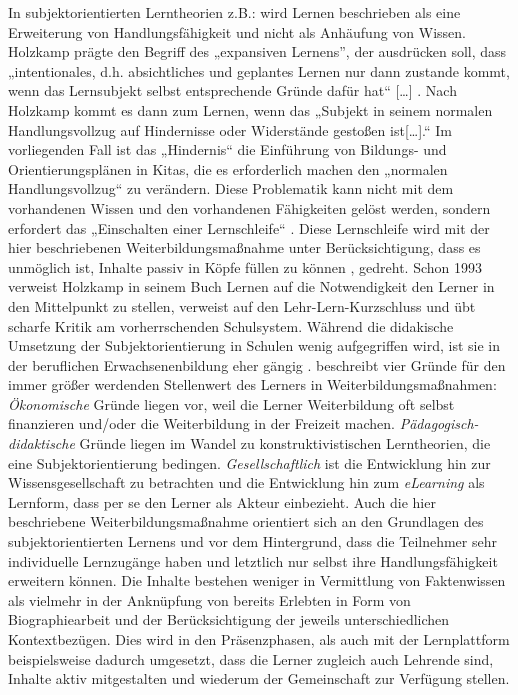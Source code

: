 \documentclass[12pt, bibliography=totoc]{scrartcl}
\begin{document}
In subjektorientierten Lerntheorien z.B.: \parencite{Holzkamp2004} wird
Lernen beschrieben als eine Erweiterung von Handlungsfähigkeit und nicht
als Anhäufung von Wissen. Holzkamp prägte den Begriff des „expansiven
Lernens'', der ausdrücken soll, dass „intentionales, d.h. absichtliches
und geplantes Lernen nur dann zustande kommt, wenn das Lernsubjekt
selbst entsprechende Gründe dafür hat`` {[}\ldots{]}
\parencite[29]{Holzkamp2004}. Nach Holzkamp kommt es dann zum Lernen,
wenn das „Subjekt in seinem normalen Handlungsvollzug auf Hindernisse
oder Widerstände gestoßen ist{[}\ldots{]}.`` Im vorliegenden Fall ist
das „Hindernis`` die Einführung von Bildungs- und Orientierungsplänen in
Kitas, die es erforderlich machen den „normalen Handlungsvollzug`` zu
verändern. Diese Problematik kann nicht mit dem vorhandenen Wissen und
den vorhandenen Fähigkeiten gelöst werden, sondern erfordert das
„Einschalten einer Lernschleife`` \parencite[29]{Holzkamp2004}. Diese
Lernschleife wird mit der hier beschriebenen Weiterbildungsmaßnahme
unter Berücksichtigung, dass es unmöglich ist, Inhalte passiv in Köpfe
füllen zu können \parencite[12]{Faulstich2012}, gedreht. Schon 1993
verweist Holzkamp in seinem Buch Lernen auf die Notwendigkeit den Lerner
in den Mittelpunkt zu stellen, verweist auf den Lehr-Lern-Kurzschluss
und übt scharfe Kritik am vorherrschenden Schulsystem. Während die
didakische Umsetzung der Subjektorientierung in Schulen wenig
aufgegriffen wird, ist sie in der beruflichen Erwachsenenbildung eher
gängig \parencite{grotluschen2005expansives}.
\textcite[138]{ehlers2011qualitat} beschreibt vier Gründe für den immer
größer werdenden Stellenwert des Lerners in Weiterbildungsmaßnahmen:
\emph{Ökonomische} Gründe liegen vor, weil die Lerner Weiterbildung oft
selbst finanzieren und/oder die Weiterbildung in der Freizeit machen.
\emph{Pädagogisch-didaktische} Gründe liegen im Wandel zu
konstruktivistischen Lerntheorien, die eine Subjektorientierung
bedingen. \emph{Gesellschaftlich} ist die Entwicklung hin zur
Wissensgesellschaft zu betrachten und die Entwicklung hin zum
\emph{eLearning} als Lernform, dass per se den Lerner als Akteur
einbezieht. Auch die hier beschriebene Weiterbildungsmaßnahme orientiert
sich an den Grundlagen des subjektorientierten Lernens und vor dem
Hintergrund, dass die Teilnehmer sehr individuelle Lernzugänge haben und
letztlich nur selbst ihre Handlungsfähigkeit erweitern können. Die
Inhalte bestehen weniger in Vermittlung von Faktenwissen als vielmehr in
der Anknüpfung von bereits Erlebten in Form von Biographiearbeit und der
Berücksichtigung der jeweils unterschiedlichen Kontextbezügen. Dies wird
in den Präsenzphasen, als auch mit der Lernplattform beispielsweise
dadurch umgesetzt, dass die Lerner zugleich auch Lehrende sind, Inhalte
aktiv mitgestalten und wiederum der Gemeinschaft zur Verfügung stellen.
\end{document}
